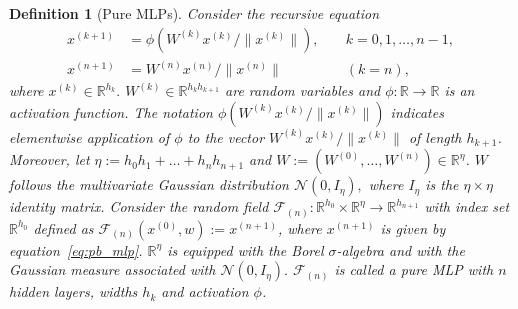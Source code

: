 \documentclass[final, 12pt]{colt2021} %
\newtheorem{dfn}{Definition}
\begin{document}


\begin{dfn}[Pure MLPs]
\label{dfn:pure_mlps}
Consider the recursive equation
\begin{equation}
\label{eq:pb_mlp}
\begin{alignedat}{2}
x^{(k+1)} &=
\phi (W^{(k)} x^{(k)} / \|x^{(k)}\|),
&& \;
k=0,1,\ldots,n-1,\\
x^{(n+1)}
&=
W^{(n)} x^{(n)} / \|x^{(n)}\|
&& \;
(k = n),
\end{alignedat}
\end{equation}
where $x^{(k)}\in\mathbb{R}^{h_{k}}.$
$W^{(k)}\in\mathbb{R}^{h_{k} h_{k+1}}$ %
are random variables
and $\phi:\mathbb{R}\rightarrow\mathbb{R}$
is an activation function.
The notation $\phi (W^{(k)} x^{(k)} / \|x^{(k)}\|)$
indicates elementwise application of $\phi$
to the vector $W^{(k)} x^{(k)} / \|x^{(k)}\|$
of length $h_{k+1}$.
Moreover, let $\eta:=h_{0}h_{1}+\ldots +h_{n}h_{n+1}$
and $W:=(W^{(0)},\ldots, W^{(n)})\in\mathbb{R}^{\eta}$.
$W$ follows
the multivariate Gaussian distribution
$
\mathcal{N}(0, I_{\eta}),
$
where $I_{\eta}$ is the $\eta\times\eta$ identity matrix.
Consider the
random field
$\mathcal{F}_{(n)}:\mathbb{R}^{h_0}\times\mathbb{R}^{\eta}
\rightarrow\mathbb{R}^{h_{n+1}}$
with index set $\mathbb{R}^{h_0}$
defined as $\mathcal{F}_{(n)}(x^{(0)},w):=x^{(n+1)}$,
where $x^{(n+1)}$ is given by equation~\eqref{eq:pb_mlp}.
$\mathbb{R}^{\eta}$ is equipped with the Borel $\sigma$-algebra
and with the Gaussian measure associated with
$
\mathcal{N}(0, I_{\eta}).
$
$\mathcal{F}_{(n)}$ is called a pure MLP
with $n$ hidden layers,
widths $h_k$ and
activation $\phi$.
\end{dfn}
\end{document}
